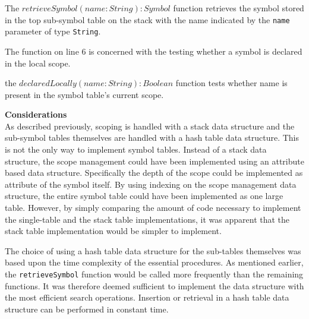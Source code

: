 The $retrieveSymbol(name: String): Symbol$ function retrieves the symbol stored in the top sub-symbol table on the stack with the name indicated by the \texttt{name} parameter of type \texttt{String}.

The function on line 6 is concerned with the testing whether a symbol is declared in the local scope.

the $declaredLocally(name: String): Boolean$ function tests whether name is present in the symbol table's current scope.

\textbf{Considerations}\\
As described previously, scoping is handled with a stack data structure and the sub-symbol tables themselves are handled with a hash table data structure.
This is not the only way to implement symbol tables.
Instead of a stack data structure, the scope management could have been implemented using an attribute based data structure.
Specifically the depth of the scope could be implemented as attribute of the symbol itself.
By using indexing on the scope management data structure, the entire symbol table could have been implemented as one large table.
However, by simply comparing the amount of code necessary to implement the single-table and the stack table implementations, it was apparent that the stack table implementation would be simpler to implement.

The choice of using a hash table data structure for the sub-tables themselves was based upon the time complexity of the essential procedures.
As mentioned earlier, the \texttt{retrieveSymbol} function would be called more frequently than the remaining functions.
It was therefore deemed sufficient to implement the data structure with the most efficient search operations.
Insertion or retrieval in a hash table data structure can be performed in constant time.
